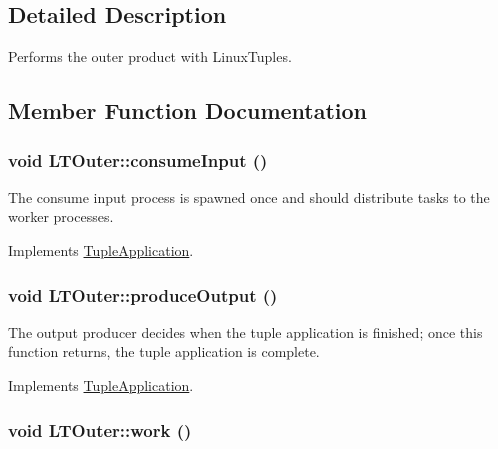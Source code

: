 \subsection{Detailed Description}
Performs the outer product with LinuxTuples. 

\subsection{Member Function Documentation}
\hypertarget{class_l_t_outer_3e0493a0d06fbc86fe614edbd752eb8a}{
\subsubsection[{consumeInput}]{\setlength{\rightskip}{0pt plus 5cm}void LTOuter::consumeInput ()}}
\label{class_l_t_outer_3e0493a0d06fbc86fe614edbd752eb8a}


The consume input process is spawned once and should distribute tasks to the worker processes. 

Implements \hyperlink{class_tuple_application_e163c5a536de01c8b94b49528a17dab2}{TupleApplication}.\hypertarget{class_l_t_outer_2a12a006761b2e1132b84209d29fddac}{
\subsubsection[{produceOutput}]{\setlength{\rightskip}{0pt plus 5cm}void LTOuter::produceOutput ()}}
\label{class_l_t_outer_2a12a006761b2e1132b84209d29fddac}


The output producer decides when the tuple application is finished; once this function returns, the tuple application is complete. 

Implements \hyperlink{class_tuple_application_8743dfcf17dedd52887c0b2ab170d8dc}{TupleApplication}.\hypertarget{class_l_t_outer_e0b1322b40271bb94c272b6117c8d16c}{
\subsubsection[{work}]{\setlength{\rightskip}{0pt plus 5cm}void LTOuter::work ()}}
\label{class_l_t_outer_e0b1322b40271bb94c272b6117c8d16c}


